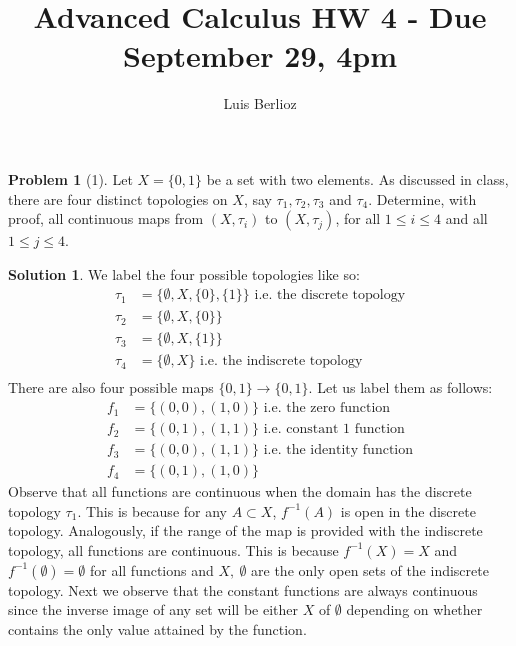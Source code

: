 \documentclass{article}
\theoremstyle{definition}
\newtheorem*{soln}{Solution}
\newtheorem*{prob}{Problem}
\theoremstyle{theorem}
\newcommand{\E}{\emptyset}
\begin{document}
\title{Advanced Calculus HW 4 - Due September 29, 4pm}
\author{Luis Berlioz}
\maketitle



\begin{prob}[1]
Let $X = \{0, 1\}$ be a set with two elements.   As discussed in class, there are four distinct topologies on $X$, say $\tau_1, \tau_2, \tau_3$ and $\tau_4$.   Determine, with proof,  all continuous maps from $(X, \tau_i)$ to $(X, \tau_j)$, for all $1\le i \le 4$ and all $1 \le j \le 4$.
\end{prob}
\begin{soln}
We label the four possible topologies like so:
    \begin{align*}
        \tau_1 &= \{ \E, X, \{0 \},\{ 1 \} \} \text{ i.e. the discrete topology} \\ 
        \tau_2 &= \{ \E, X, \{0 \} \} \\ 
        \tau_3 &= \{ \E, X, \{1 \} \} \\ 
        \tau_4 &= \{ \E, X  \} \text{ i.e. the indiscrete topology} \\ 
    \end{align*}
    There are also four possible maps $\{0,1  \}\to \{0,1\}$. Let us label them as follows:
    \begin{align*}
        f_1 &= \{ (0,0), (1,0)  \}   \text{ i.e. the zero  function} \\ 
        f_2 &= \{ (0,1), (1,1)  \}   \text{ i.e. constant 1 function} \\ 
        f_3 &= \{ (0,0), (1,1)  \}   \text{ i.e. the identity function} \\ 
        f_4 &= \{ (0,1), (1,0)  \}
    \end{align*}
    Observe that all functions are continuous when the domain has the discrete topology $\tau_1$. This is because for any $A\subset X$, $f^{-1}(A)$ is open in the discrete topology. Analogously, if the range of the map is provided with the indiscrete topology, all functions are continuous. This is because $f^{-1}(X)=X$ and $f^{-1}(\E)= \E$ for all functions and $X,\ \E$ are the only open sets of the indiscrete topology. Next we observe that the constant functions are always continuous since the inverse image of any set will be either $X$ of $\E$ depending on whether contains the only value attained by the function. 


\end{soln}
\end{document}
